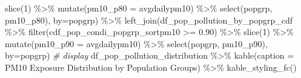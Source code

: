 \documentclass[
]{book}
\newenvironment{Shaded}{\begin{snugshade}}{\end{snugshade}}
\newcommand{\AttributeTok}[1]{\textcolor[rgb]{0.77,0.63,0.00}{#1}}
\newcommand{\CommentTok}[1]{\textcolor[rgb]{0.56,0.35,0.01}{\textit{#1}}}
\newcommand{\DecValTok}[1]{\textcolor[rgb]{0.00,0.00,0.81}{#1}}
\newcommand{\FloatTok}[1]{\textcolor[rgb]{0.00,0.00,0.81}{#1}}
\newcommand{\FunctionTok}[1]{\textcolor[rgb]{0.00,0.00,0.00}{#1}}
\newcommand{\NormalTok}[1]{#1}
\newcommand{\SpecialCharTok}[1]{\textcolor[rgb]{0.00,0.00,0.00}{#1}}
\newcommand{\StringTok}[1]{\textcolor[rgb]{0.31,0.60,0.02}{#1}}
\begin{document}
\begin{Shaded}
\begin{Highlighting}[]
              \FunctionTok{slice}\NormalTok{(}\DecValTok{1}\NormalTok{) }\SpecialCharTok{\%\textgreater{}\%}
              \FunctionTok{mutate}\NormalTok{(}\AttributeTok{pm10\_p80 =}\NormalTok{ avgdailypm10) }\SpecialCharTok{\%\textgreater{}\%}
              \FunctionTok{select}\NormalTok{(popgrp, pm10\_p80), }
            \AttributeTok{by=}\StringTok{\textquotesingle{}popgrp\textquotesingle{}}\NormalTok{) }\SpecialCharTok{\%\textgreater{}\%}
  \FunctionTok{left\_join}\NormalTok{(df\_pop\_pollution\_by\_popgrp\_cdf }\SpecialCharTok{\%\textgreater{}\%} 
              \FunctionTok{filter}\NormalTok{(cdf\_pop\_condi\_popgrp\_sortpm10 }\SpecialCharTok{\textgreater{}=} \FloatTok{0.90}\NormalTok{) }\SpecialCharTok{\%\textgreater{}\%}
              \FunctionTok{slice}\NormalTok{(}\DecValTok{1}\NormalTok{) }\SpecialCharTok{\%\textgreater{}\%}
              \FunctionTok{mutate}\NormalTok{(}\AttributeTok{pm10\_p90 =}\NormalTok{ avgdailypm10) }\SpecialCharTok{\%\textgreater{}\%}
              \FunctionTok{select}\NormalTok{(popgrp, pm10\_p90), }
            \AttributeTok{by=}\StringTok{\textquotesingle{}popgrp\textquotesingle{}}\NormalTok{)}
\CommentTok{\# display}
\NormalTok{df\_pop\_pollution\_distribution }\SpecialCharTok{\%\textgreater{}\%} 
  \FunctionTok{kable}\NormalTok{(}\AttributeTok{caption =} \StringTok{\textquotesingle{}PM10 Exposure Distribution by Population Groups\textquotesingle{}}\NormalTok{) }\SpecialCharTok{\%\textgreater{}\%} 
  \FunctionTok{kable\_styling\_fc}\NormalTok{()}
\end{Highlighting}
\end{Shaded}
\end{document}
